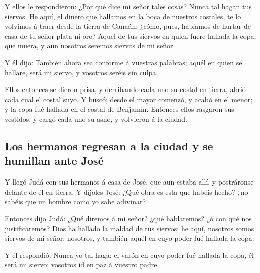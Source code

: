  Y ellos le respondieron: ¿Por qué dice mi señor tales
cosas? Nunca tal hagan tus siervos.  He aquí, el dinero que
hallamos en la boca de nuestros costales, te lo volvimos á traer desde
la tierra de Canaán; ¿cómo, pues, habíamos de hurtar de casa de tu señor
plata ni oro?  Aquel de tus siervos en quien fuere hallada
la copa, que muera, y aun nosotros seremos siervos de mi señor.

 Y él dijo: También ahora sea conforme á vuestras palabras;
aquél en quien se hallare, será mi siervo, y vosotros seréis sin culpa.

 Ellos entonces se dieron prisa, y derribando cada uno su
costal en tierra, abrió cada cual el costal suyo.  Y buscó;
desde el mayor comenzó, y acabó en el menor; y la copa fué hallada en el
costal de Benjamín.  Entonces ellos rasgaron sus vestidos,
y cargó cada uno su asno, y volvieron á la ciudad.

\hypertarget{los-hermanos-regresan-a-la-ciudad-y-se-humillan-ante-josuxe9}{%
\subsection{Los hermanos regresan a la ciudad y se humillan ante
José}\label{los-hermanos-regresan-a-la-ciudad-y-se-humillan-ante-josuxe9}}

 Y llegó Judá con sus hermanos á casa de José, que aun
estaba allí, y postráronse delante de él en tierra.  Y
díjoles José: ¿Qué obra es esta que habéis hecho? ¿no sabéis que un
hombre como yo sabe adivinar?

 Entonces dijo Judá: ¿Qué diremos á mi señor? ¿qué
hablaremos? ¿ó con qué nos justificaremos? Dios ha hallado la maldad de
tus siervos: he aquí, nosotros somos siervos de mi señor, nosotros, y
también aquél en cuyo poder fué hallada la copa.

 Y él respondió: Nunca yo tal haga: el varón en cuyo poder
fué hallada la copa, él será mi siervo; vosotros id en paz á vuestro
padre.

